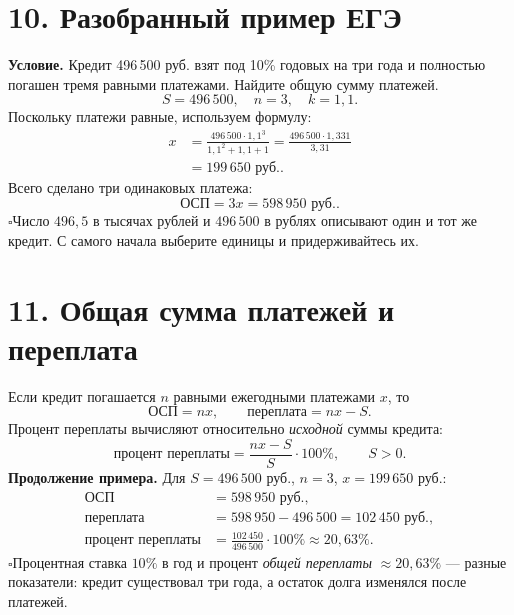 \documentclass[a4paper,12pt]{article}
\newcommand{\checkitem}[1]{\noindent\(\square\)\enspace #1\par}
\newcommand{\smallrule}{\par\smallskip\noindent{\color{lightline}\rule{\linewidth}{.4pt}}\par\smallskip}
\newcommand{\rub}{\text{ руб.}}
\begin{document}
\clearpage
\section*{10. Разобранный пример ЕГЭ}
\textbf{Условие.} Кредит 496\,500 руб. взят под 10\% годовых на три года и полностью погашен тремя равными платежами. Найдите общую сумму платежей.
\[
S=496\,500,\quad n=3,\quad k=1{,}1.
\]
Поскольку платежи равные, используем формулу:
\[
\begin{aligned}
x&=\frac{496\,500\cdot1{,}1^3}{1{,}1^2+1{,}1+1}
 =\frac{496\,500\cdot1{,}331}{3{,}31}\\
 &=\boxed{199\,650\rub}.
\end{aligned}
\]
Всего сделано три одинаковых платежа:
\[
\boxed{\text{ОСП}=3x=598\,950\rub}.
\]
\checkitem{Число \(496{,}5\) в тысячах рублей и \(496\,500\) в рублях описывают один и тот же кредит. С самого начала выберите единицы и придерживайтесь их.}

\section*{11. Общая сумма платежей и переплата}
Если кредит погашается \(n\) равными ежегодными платежами \(x\), то
\[
\boxed{\text{ОСП}=nx},\qquad
\boxed{\text{переплата}=nx-S}.
\]
Процент переплаты вычисляют относительно \emph{исходной} суммы кредита:
\[
\boxed{\text{процент переплаты}=\frac{nx-S}{S}\cdot100\%},\qquad S>0.
\]
\textbf{Продолжение примера.} Для \(S=496\,500\) руб., \(n=3\), \(x=199\,650\) руб.:
\[
\begin{aligned}
\text{ОСП}&=598\,950\rub,\\
\text{переплата}&=598\,950-496\,500=102\,450\rub,\\
\text{процент переплаты}&=\frac{102\,450}{496\,500}\cdot100\%
\approx20{,}63\%.
\end{aligned}
\]
\checkitem{Процентная ставка \(10\%\) в год и процент \emph{общей переплаты} \(\approx20{,}63\%\) --- разные показатели: кредит существовал три года, а остаток долга изменялся после платежей.}
\smallrule
\clearpage
\end{document}
